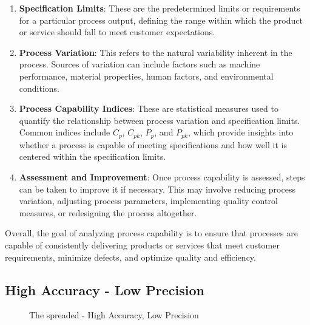 \documentclass[
  a4paper,
]{scrbook}
\begin{document}
\begin{enumerate}
\def\labelenumi{\arabic{enumi}.}
\item
  \textbf{Specification Limits}: These are the predetermined limits or
  requirements for a particular process output, defining the range
  within which the product or service should fall to meet customer
  expectations.
\item
  \textbf{Process Variation}: This refers to the natural variability
  inherent in the process. Sources of variation can include factors such
  as machine performance, material properties, human factors, and
  environmental conditions.
\item
  \textbf{Process Capability Indices}: These are statistical measures
  used to quantify the relationship between process variation and
  specification limits. Common indices include \(C_p\), \(C_{pk}\),
  \(P_p\), and \(P_{pk}\), which provide insights into whether a process
  is capable of meeting specifications and how well it is centered
  within the specification limits.
\item
  \textbf{Assessment and Improvement}: Once process capability is
  assessed, steps can be taken to improve it if necessary. This may
  involve reducing process variation, adjusting process parameters,
  implementing quality control measures, or redesigning the process
  altogether.
\end{enumerate}

Overall, the goal of analyzing process capability is to ensure that
processes are capable of consistently delivering products or services
that meet customer requirements, minimize defects, and optimize quality
and efficiency.

\subsection{High Accuracy - Low
Precision}\label{high-accuracy---low-precision}

\begin{figure}[H]


\caption{\label{fig-halp}The spreaded - High Accuracy, Low Precision}

\end{figure}%
\end{document}
